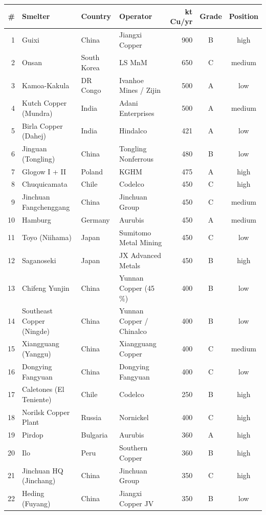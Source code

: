 \documentclass[10pt,a4paper]{article}
\begin{document}
{\small
{}
\begin{longtable}{@{}r l l l r c c@{}}
\toprule
\textbf{\#} & \textbf{Smelter} & \textbf{Country} & \textbf{Operator} & \textbf{kt Cu/yr} & \textbf{Grade} & \textbf{Position}\\
\midrule
\endhead
1 & Guixi & China & Jiangxi Copper & 900 & B & high\\
2 & Onsan & South Korea & LS MnM & 650 & C & medium\\
3 & Kamoa-Kakula & DR Congo & Ivanhoe Mines / Zijin & 500 & A & low\\
4 & Kutch Copper (Mundra) & India & Adani Enterprises & 500 & A & medium\\
5 & Birla Copper (Dahej) & India & Hindalco & 421 & A & low\\
6 & Jinguan (Tongling) & China & Tongling Nonferrous & 480 & B & low\\
7 & Glogow I + II & Poland & KGHM & 475 & A & high\\
8 & Chuquicamata & Chile & Codelco & 450 & C & high\\
9 & Jinchuan Fangchenggang & China & Jinchuan Group & 450 & C & medium\\
10 & Hamburg & Germany & Aurubis & 450 & A & medium\\
11 & Toyo (Niihama) & Japan & Sumitomo Metal Mining & 450 & C & low\\
12 & Saganoseki & Japan & JX Advanced Metals & 450 & B & high\\
13 & Chifeng Yunjin & China & Yunnan Copper (45\,\%) & 400 & B & low\\
14 & Southeast Copper (Ningde) & China & Yunnan Copper / Chinalco & 400 & B & low\\
15 & Xiangguang (Yanggu) & China & Xiangguang Copper & 400 & C & medium\\
16 & Dongying Fangyuan & China & Dongying Fangyuan & 400 & C & low\\
17 & Caletones (El Teniente) & Chile & Codelco & 250 & B & high\\
18 & Norilsk Copper Plant & Russia & Nornickel & 400 & C & high\\
19 & Pirdop & Bulgaria & Aurubis & 360 & A & high\\
20 & Ilo & Peru & Southern Copper & 360 & B & high\\
21 & Jinchuan HQ (Jinchang) & China & Jinchuan Group & 350 & C & high\\
22 & Heding (Fuyang) & China & Jiangxi Copper JV & 350 & B & low\\

\end{longtable}}
\end{document}
